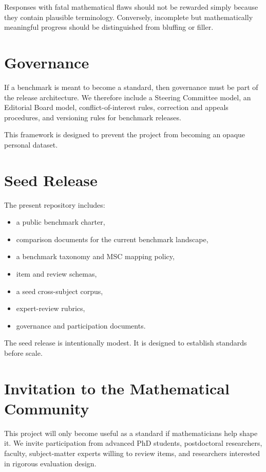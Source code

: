 \documentclass[11pt]{article}
\begin{document}
Responses with fatal mathematical flaws should not be rewarded simply because they contain plausible terminology. Conversely, incomplete but mathematically meaningful progress should be distinguished from bluffing or filler.

\section{Governance}

If a benchmark is meant to become a standard, then governance must be part of the release architecture. We therefore include a Steering Committee model, an Editorial Board model, conflict-of-interest rules, correction and appeals procedures, and versioning rules for benchmark releases.

This framework is designed to prevent the project from becoming an opaque personal dataset.

\section{Seed Release}

The present repository includes:
\begin{itemize}[leftmargin=*]
  \item a public benchmark charter,
  \item comparison documents for the current benchmark landscape,
  \item a benchmark taxonomy and MSC mapping policy,
  \item item and review schemas,
  \item a seed cross-subject corpus,
  \item expert-review rubrics,
  \item governance and participation documents.
\end{itemize}

The seed release is intentionally modest. It is designed to establish standards before scale.

\section{Invitation to the Mathematical Community}

This project will only become useful as a standard if mathematicians help shape it. We invite participation from advanced PhD students, postdoctoral researchers, faculty, subject-matter experts willing to review items, and researchers interested in rigorous evaluation design.
\end{document}
